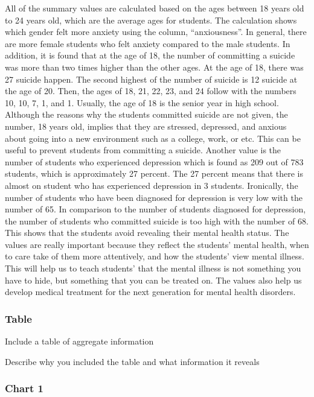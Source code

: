 \documentclass[
]{article}
\begin{document}
All of the summary values are calculated based on the ages between 18
years old to 24 years old, which are the average ages for students. The
calculation shows which gender felt more anxiety using the column,
``anxiousness''. In general, there are more female students who felt
anxiety compared to the male students. In addition, it is found that at
the age of 18, the number of committing a suicide was more than two
times higher than the other ages. At the age of 18, there was 27 suicide
happen. The second highest of the number of suicide is 12 suicide at the
age of 20. Then, the ages of 18, 21, 22, 23, and 24 follow with the
numbers 10, 10, 7, 1, and 1. Usually, the age of 18 is the senior year
in high school. Although the reasons why the students committed suicide
are not given, the number, 18 years old, implies that they are stressed,
depressed, and anxious about going into a new environment such as a
college, work, or etc. This can be useful to prevent students from
committing a suicide. Another value is the number of students who
experienced depression which is found as 209 out of 783 students, which
is approximately 27 percent. The 27 percent means that there is almost
on student who has experienced depression in 3 students. Ironically, the
number of students who have been diagnosed for depression is very low
with the number of 65. In comparison to the number of students diagnosed
for depression, the number of students who committed suicide is too high
with the number of 68. This shows that the students avoid revealing
their mental health status. The values are really important because they
reflect the students' mental health, when to care take of them more
attentively, and how the students' view mental illness. This will help
us to teach students' that the mental illness is not something you have
to hide, but something that you can be treated on. The values also help
us develop medical treatment for the next generation for mental health
disorders.

\hypertarget{table}{%
\subsubsection{Table}\label{table}}

Include a table of aggregate information

Describe why you included the table and what information it reveals

\hypertarget{chart-1}{%
\subsubsection{Chart 1}\label{chart-1}}
\end{document}
